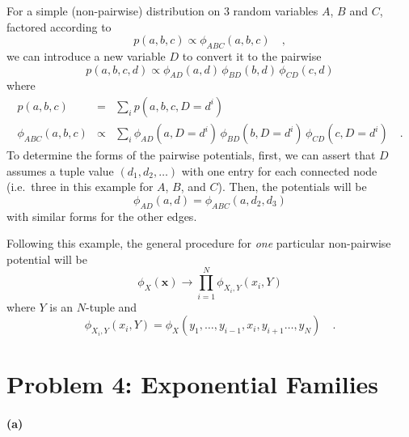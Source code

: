 \documentclass[11pt]{article}
\newcommand{\pr}[1]{\ensuremath{p(#1)}}
\newcommand{\bvec}[1]{\ensuremath{\boldsymbol{#1}}}
\renewcommand{\vector}[1]{\bvec{#1}}
\begin{document}
For a simple (non-pairwise) distribution on 3 random variables $A$, $B$ and
$C$, factored according to
\begin{equation}
    \pr{a,b,c} \propto \phi_{ABC} (a,b,c) \quad ,
\end{equation}
we can introduce a new variable $D$ to convert it to the pairwise
\begin{equation}
    \pr{a,b,c,d} \propto \phi_{AD} (a,d) \, \phi_{BD} (b,d) \, \phi_{CD} (c,d)
\end{equation}
where
\begin{eqnarray}
    \pr{a,b,c} &=& \sum_i \pr{a,b,c,D=d^i} \\
    \phi_{ABC} (a,b,c) &\propto& \sum_i
        \phi_{AD} (a,D=d^i) \, \phi_{BD} (b,D=d^i) \, \phi_{CD} (c,D=d^i) \quad .
\end{eqnarray}
To determine the forms of the pairwise potentials, first, we can assert that
$D$ assumes a tuple value $(d_1, d_2, \ldots)$
with one entry for each connected node (i.e.~three in this example
for $A$, $B$, and $C$). Then, the potentials will be
\begin{equation}
    \phi_{AD} (a,d) = \phi_{ABC} (a, d_2, d_3)
\end{equation}
with similar forms for the other edges.

Following this example, the general procedure for \emph{one} particular
non-pairwise potential will be
\begin{equation}
    \phi_{X} (\vector{x}) \to \prod_{i=1}^N \phi_{X_i, Y} (x_i, Y)
\end{equation}
where $Y$ is an $N$-tuple and
\begin{equation}
    \phi_{X_i, Y} (x_i, Y) = \phi_X (y_1, \ldots, y_{i-1}, x_i, y_{i+1} \ldots, y_N) \quad .
\end{equation}

\section{Problem 4: Exponential Families}

\paragraph{(a)}
\end{document}
